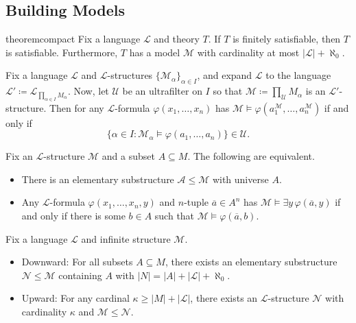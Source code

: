 \documentclass{article}
\begin{document}
\subsection{Building Models}
\begin{restatable}[compactness]{theorem}{compact} \label{thm:compactness}
	Fix a language $\mathcal L$ and theory $T$. If $T$ is finitely satisfiable, then $T$ is satisfiable. Furthermore, $T$ has a model $\mathcal M$ with cardinality at most $\left|\mathcal L\right|+\aleph_0$.
\end{restatable}
\begin{theorem}[\L{}o\'s] \label{thm:los}
	Fix a language $\mathcal L$ and $\mathcal L$-structures $\{\mathcal M_\alpha\}_{\alpha\in I}$, and expand $\mathcal L$ to the language $\mathcal L'\coloneqq\mathcal L_{\prod_{\alpha\in I}M_\alpha}$. Now, let $\mathcal U$ be an ultrafilter on $I$ so that $\mathcal M\coloneqq\prod_\mathcal UM_\alpha$ is an $\mathcal L'$-structure. Then for any $\mathcal L$-formula $\varphi(x_1,\ldots,x_n)$ has $\mathcal M\models\varphi\left(a_1^\mathcal M,\ldots,a_n^\mathcal M\right)$ if and only if
	\[\{\alpha\in I:\mathcal M_\alpha\models\varphi(a_1,\ldots,a_n)\}\in\mathcal U.\]
\end{theorem}
\begin{lemma} \label{lem:tarski-vaught}
	Fix an $\mathcal L$-structure $\mathcal M$ and a subset $A\subseteq M$. The following are equivalent.
	\begin{itemize}
		\item There is an elementary substructure $\mathcal A\le\mathcal M$ with universe $A$.
		\item Any $\mathcal L$-formula $\varphi(x_1,\ldots,x_n,y)$ and $n$-tuple $\overline a\in A^n$ has $\mathcal M\models\exists y\,\varphi(\overline a,y)$ if and only if there is some $b\in A$ such that $\mathcal M\models\varphi(\overline a,b)$.
	\end{itemize}
\end{lemma}
\begin{theorem} \label{thm:down-skolem}
	Fix a language $\mathcal L$ and infinite structure $\mathcal M$.
	\begin{itemize}
		\item Downward: For all subsets $A\subseteq M$, there exists an elementary substructure $\mathcal N\le\mathcal M$ containing $A$ with $\left|N\right|=\left|A\right|+\left|\mathcal L\right|+\aleph_0$.
		\item Upward: For any cardinal $\kappa\ge\left|M\right|+\left|\mathcal L\right|$, there exists an $\mathcal L$-structure $\mathcal N$ with cardinality $\kappa$ and $\mathcal M\le\mathcal N$.
	\end{itemize}
\end{theorem}
\end{document}

